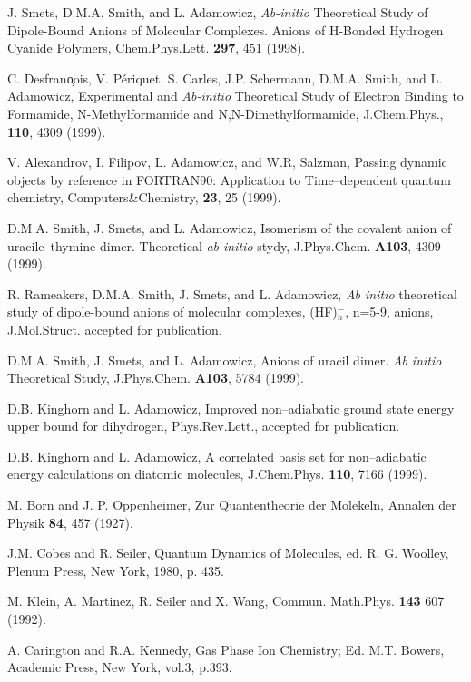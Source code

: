 \begin{thebibliography}{999}
J. Smets, D.M.A. Smith, and L. Adamowicz,
{\it Ab-initio} Theoretical Study of Dipole-Bound
Anions of Molecular Complexes. 
Anions of H-Bonded Hydrogen Cyanide Polymers,
Chem.Phys.Lett. {\bf 297}, 451 (1998).



C. Desfran\c{o}ois, V. P\'{e}riquet, S. Carles, J.P. Schermann,
D.M.A. Smith, and L. Adamowicz,
Experimental and {\it Ab-initio} Theoretical Study of Electron
Binding to Formamide, N-Methylformamide and N,N-Dimethylformamide,
J.Chem.Phys., {\bf 110}, 4309 (1999).

V. Alexandrov, I. Filipov, L. Adamowicz, and W.R, Salzman,
Passing dynamic objects by reference in FORTRAN90:
Application to Time--dependent quantum chemistry,
Computers\&Chemistry, {\bf 23}, 25 (1999).

D.M.A. Smith, J. Smets, and L. Adamowicz,
Isomerism of the covalent anion of uracile--thymine dimer.
Theoretical {\it ab initio} stydy,
J.Phys.Chem. {\bf A103}, 4309 (1999).

R. Rameakers, D.M.A. Smith, J. Smets, and L. Adamowicz,
{\it Ab initio} theoretical study of dipole-bound
anions of molecular complexes, (HF)$^-_n$, n=5-9,
anions, J.Mol.Struct. accepted for publication.

D.M.A. Smith, J. Smets, and L. Adamowicz,
Anions of uracil dimer. {\it Ab initio} Theoretical Study,
J.Phys.Chem. {\bf A103}, 5784 (1999).


D.B. Kinghorn and L. Adamowicz,
Improved non--adiabatic ground state energy
upper bound for dihydrogen,
Phys.Rev.Lett., accepted for publication.


D.B. Kinghorn and L. Adamowicz,
A correlated basis set for non--adiabatic energy 
calculations on diatomic molecules,
J.Chem.Phys. {\bf 110}, 7166 (1999).


 M. Born and J. P. Oppenheimer, 
Zur Quantentheorie der Molekeln,
Annalen der Physik 
{\bf 84}, 457 (1927).

 J.M. Cobes and R. Seiler, Quantum Dynamics of Molecules,
ed. R. G.  Woolley, Plenum Press, New York, 1980, p. 435.

 M. Klein, A. Martinez, R. Seiler and X. Wang, Commun.
Math.Phys. {\bf 143}  607 (1992).

A. Carington and R.A. Kennedy, Gas Phase Ion Chemistry;
Ed. M.T. Bowers, Academic Press, New York, vol.3, p.393.






\end{thebibliography}
